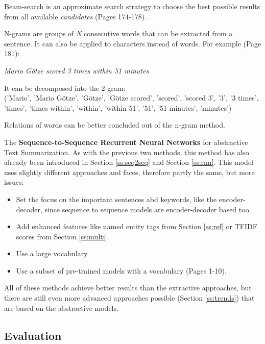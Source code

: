 Beam-search is an approximate search strategy to choose the best possible results from all available \textit{candidates} \cite{beam} (Pages 174-178). 

N-grams are groups of \textit{N} consecutive words that can be extracted from
a sentence. It can also be applied to characters instead of words. For example \cite{py} (Page 181):

\begin{tcolorbox}
	\begin{center}
		\textit{Mario Götze scored 3 times within 51 minutes} \\ 
	\end{center}
	
	It can be decomposed into the 2-gram:\\
	
	('Mario', 'Mario Götze', 'Götze', 'Götze scored', 'scored', 'scored 3', '3', '3 times', 'times',
	'times within', 'within', 'within 51', '51', '51 minutes', 'minutes')
\end{tcolorbox}

Relations of words can be better concluded out of the n-gram method.


The \textbf{Sequence-to-Sequence Recurrent Neural Networks} for abstractive Text Summarization. As with the previous two methods, this method has also already been introduced in Section \ref{ss:seq2seq} and Section \ref{ss:rnn}. This model uses slightly different approaches and faces, therefore partly the same, but more issues:

\begin{itemize}
	\item Set the focus on the important sentences abd keywords, like the encoder-decoder, since sequence to sequence models are encoder-decoder based too.
	\item Add enhanced features like named entity tags from Section \ref{ss:ref} or TFIDF scores from Section \ref{ss:multi}. 
	\item Use a large vocabulary
	\item Use a subset of pre-trained models with a vocabulary \cite{jean-etal-2015-using} (Pages 1-10).
\end{itemize}

All of these methods achieve better results than the extractive approaches, but there are still even more advanced approaches possible (Section \ref{ss:trends}) that are based on the abstractive models.  

\subsection{Evaluation}\label{ss:ev}

